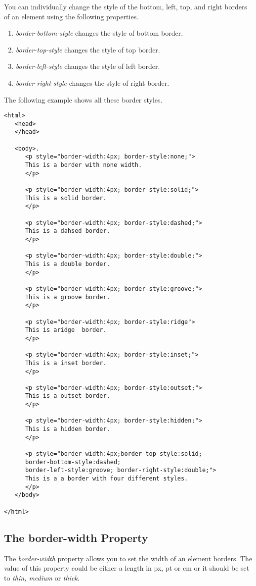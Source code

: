 \documentclass[a4paper,oneside]{book}
\numberwithin{equation}{chapter}
\begin{document}
You can individually change the style of the bottom, left, top, and right borders of an element using the following properties.
\begin{enumerate}
\item \textit{border-bottom-style} changes the style of bottom border.
\item \textit{border-top-style} changes the style of top border.
\item \textit{border-left-style} changes the style of left border.
\item \textit{border-right-style} changes the style of right border.
\end{enumerate}
The following example shows all these border styles.
\begin{verbatim}
<html>
   <head>
   </head>
   
   <body>.
      <p style="border-width:4px; border-style:none;">
      This is a border with none width.
      </p>
      
      <p style="border-width:4px; border-style:solid;">
      This is a solid border.
      </p>
      
      <p style="border-width:4px; border-style:dashed;">
      This is a dahsed border.
      </p>
      
      <p style="border-width:4px; border-style:double;">
      This is a double border.
      </p>
      
      <p style="border-width:4px; border-style:groove;">
      This is a groove border.
      </p>
      
      <p style="border-width:4px; border-style:ridge">
      This is aridge  border.
      </p>
      
      <p style="border-width:4px; border-style:inset;">
      This is a inset border.
      </p>
      
      <p style="border-width:4px; border-style:outset;">
      This is a outset border.
      </p>
      
      <p style="border-width:4px; border-style:hidden;">
      This is a hidden border.
      </p>
      
      <p style="border-width:4px;border-top-style:solid;
      border-bottom-style:dashed; 
      border-left-style:groove; border-right-style:double;">
      This is a a border with four different styles.
      </p>
   </body>
   
</html> 
\end{verbatim}
\subsection{The border-width Property}
The \textit{border-width} property allows you to set the width of an element borders. The value of this property could be either a length in px, pt or cm or it should be set to \textit{thin, medium} or \textit{thick}.
\end{document}
